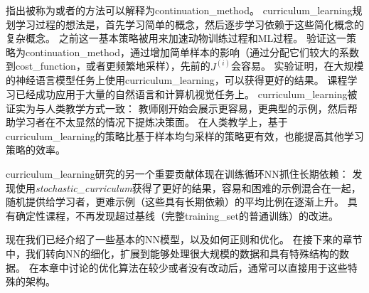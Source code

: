 \cite{Bengio+al-2009}指出被称为或者的方法可以解释为\gls{continuation_method}。
\gls{curriculum_learning}规划学习过程的想法是，首先学习简单的概念，然后逐步学习依赖于这些简化概念的复杂概念。
之前这一基本策略被用来加速动物训练过程\citep{Skinner1958,Peterson2004,Krueger+Dayan-2009}和\gls{ML}过程\citep{solomonoff1989system,Elman93,Sanger-1994}。
\cite{Bengio+al-2009}验证这一策略为\gls{continuation_method}，通过增加简单样本的影响（通过分配它们较大的系数到\gls{cost_function}，或者更频繁地采样），先前的$J^{(i)}$会容易。
实验证明，在大规模的神经语言模型任务上使用\gls{curriculum_learning}，可以获得更好的结果。
课程学习已经成功应用于大量的自然语言\citep{Spitkovsky-et-al-HLT2010,collobert2011natural,Mikolov-ASRU-2011,Tu+Honavar-IJCAI2011}和计算机视觉\citep{Kumar+al-2010,Lee+Grauman-CVPR2011,Supancic+Ramanan-CVPR2013}任务上。
\gls{curriculum_learning}被证实为与人类教学方式一致\citep{Khan+Zhu+Mutlu-2011}：
教师刚开始会展示更容易，更典型的示例，然后帮助学习者在不太显然的情况下提炼决策面。
在人类教学上，基于\gls{curriculum_learning}的策略比基于样本均匀采样的策略更有效，也能提高其他学习策略的效率\citep{Basu+Christensen-AAAI2013}。


\gls{curriculum_learning}研究的另一个重要贡献体现在训练循环\gls{NN}抓住长期依赖：
\cite{Zaremba+Sutskever-arxiv2014}发现使用\emph{\gls{stochastic_curriculum}}获得了更好的结果，容易和困难的示例混合在一起，随机提供给学习者，更难示例（这些具有长期依赖）的平均比例在逐渐上升。
具有确定性课程，不再发现超过基线（完整\gls{training_set}的普通训练）的改进。

现在我们已经介绍了一些基本的\gls{NN}模型，以及如何正则和优化。
在接下来的章节中，我们转向\gls{NN}的细化，扩展到能够处理很大规模的数据和具有特殊结构的数据。
在本章中讨论的优化算法在较少或者没有改动后，通常可以直接用于这些特殊的架构。




















